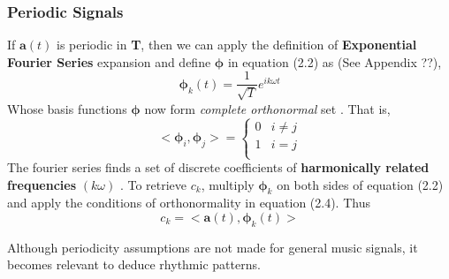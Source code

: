 \subsubsection{Periodic Signals}
If $\textbf{a}(t)$ is periodic in \textbf{T}, then we can apply the definition of \textbf{Exponential Fourier Series} expansion and define $\bm{\phi}$ in equation (2.2) as (See Appendix ??),
\begin{equation}
\bm{\phi}_{k}(t) = \frac{1}{\sqrt{T}}e^{ik \omega t}
\end{equation}    
Whose basis functions $\bm{\phi}$ now form \textit{complete orthonormal} set \cite{allen}. That is, 
\begin{equation}
 < \bm{\phi}_{i}, \bm{\phi}_{j} > =
	\begin{cases}
	  0 & i \neq j \\
	  1 &  i = j \\ 
	\end{cases}
\end{equation}
The fourier series finds a set of discrete coefficients of \textbf{harmonically related frequencies} $(k \omega )$ . To retrieve $c_{k}$, multiply $\bm{\phi}_{k}$ on both sides of equation (2.2) and apply the conditions of orthonormality in equation (2.4). Thus
\begin{equation}
c_{k} = <\textbf{a}(t), \bm{\phi}_{k}(t)>
\end{equation}

Although periodicity assumptions are not made for general music signals, it becomes relevant to deduce rhythmic patterns. 

